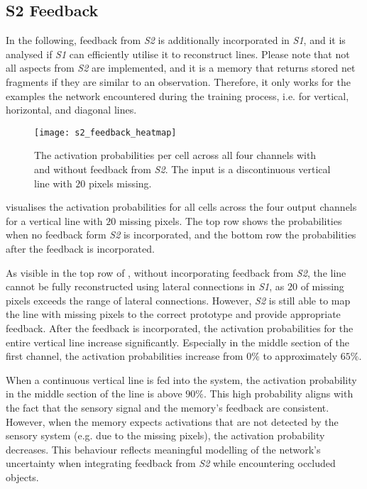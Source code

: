 \subsection{S2 Feedback}
In the following, feedback from \emph{S2} is additionally incorporated in \emph{S1}, and it is analysed if \emph{S1} can efficiently utilise it to reconstruct lines.
Please note that not all aspects from \emph{S2} are implemented, and it is a memory that returns stored net fragments if they are similar to an observation.
Therefore, it only works for the examples the network encountered during the training process, i.e. for vertical, horizontal, and diagonal lines.

\begin{figure}[h]
    \centering
    \texttt{[image: s2\_feedback\_heatmap]}
    \caption[Activation probabilities with/without \emph{S2} feedback]{The activation probabilities per cell across all four channels with and without feedback from \emph{S2}. The input is a discontinuous vertical line with $20$ pixels missing.}
\end{figure}
%
 visualises the activation probabilities for all cells across the four output channels for a vertical line with $20$ missing pixels.
The top row shows the probabilities when no feedback form \emph{S2} is incorporated, and the bottom row the probabilities after the feedback is incorporated.

As visible in the top row of , without incorporating feedback from \emph{S2}, the line cannot be fully reconstructed using lateral connections in \emph{S1}, as $20$ of missing pixels exceeds the range of lateral connections. However, \emph{S2} is still able to map the line with missing pixels to the correct prototype and provide appropriate feedback. After the feedback is incorporated, the activation probabilities for the entire vertical line increase significantly. Especially in the middle section of the first channel, the activation probabilities increase from $0\%$ to approximately $65\%$.

When a continuous vertical line is fed into the system, the activation probability in the middle section of the line is above $90\%$.
This high probability aligns with the fact that the sensory signal and the memory's feedback are consistent.
However, when the memory expects activations that are not detected by the sensory system (e.g. due to the missing pixels), the activation probability decreases. This behaviour reflects meaningful modelling of the network's uncertainty when integrating feedback from \emph{S2} while encountering occluded objects.

